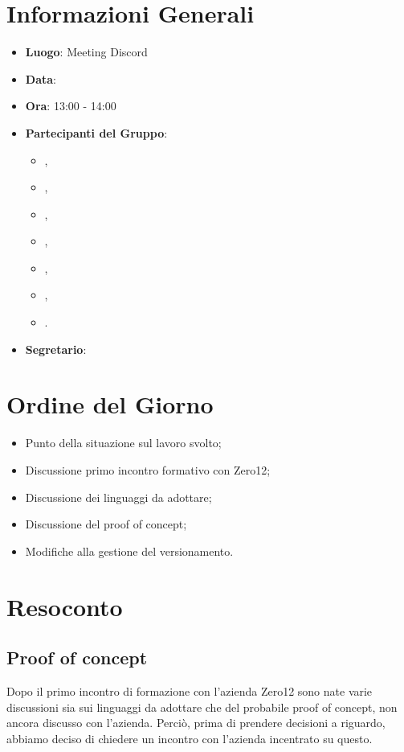 \section{Informazioni Generali}

\begin{itemize}
\item{\textbf{Luogo}}: Meeting Discord
\item{\textbf{Data}}: \D{}
\item{\textbf{Ora}}: 13:00 - 14:00
\item{\textbf{Partecipanti del Gruppo}}: 
	\begin{itemize}
	\item{\EP{},} 
	\item{\FP{},}
	\item{\GC{},}
	\item{\LW{},}
	\item{\MB{},}
	\item{\MG{},}
	\item{\PV{}.}
	\end{itemize} 
\item{\textbf{Segretario}}: \PV{}	
\end{itemize}

\section{Ordine del Giorno}
\begin{itemize}
\item{Punto della situazione sul lavoro svolto;}
\item{Discussione primo incontro formativo con Zero12;}
\item{Discussione dei linguaggi da adottare;}
\item{Discussione del proof of concept;}
\item{Modifiche alla gestione del versionamento.}
\end{itemize}

\section{Resoconto}

\subsection{Proof of concept}
Dopo il primo incontro di formazione con l'azienda Zero12 sono nate varie discussioni sia sui linguaggi da adottare che del probabile proof of concept, non ancora discusso con l'azienda. Perciò, prima di prendere decisioni a riguardo, abbiamo deciso di chiedere un incontro con l'azienda incentrato su questo.


